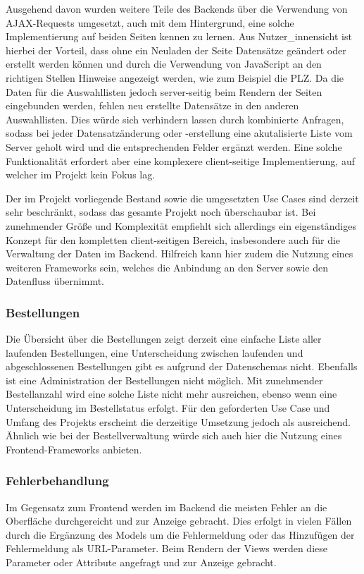 		Ausgehend davon wurden weitere Teile des Backends über die Verwendung von AJAX-Requests umgesetzt, auch mit dem Hintergrund, eine solche Implementierung auf beiden Seiten kennen zu lernen. Aus Nutzer\_innensicht ist hierbei der Vorteil, dass ohne ein Neuladen der Seite Datensätze geändert oder erstellt werden können und durch die Verwendung von JavaScript an den richtigen Stellen Hinweise angezeigt werden, wie zum Beispiel die PLZ. Da die Daten für die Auswahllisten jedoch server-seitig beim Rendern der Seiten eingebunden werden, fehlen neu erstellte Datensätze in den anderen Auswahllisten. Dies würde sich verhindern lassen durch kombinierte Anfragen, sodass bei jeder Datensatzänderung oder -erstellung eine akutalisierte Liste vom Server geholt wird und die entsprechenden Felder ergänzt werden. Eine solche Funktionalität erfordert aber eine komplexere client-seitige Implementierung, auf welcher im Projekt kein Fokus lag.
		
		Der im Projekt vorliegende Bestand sowie die umgesetzten Use Cases sind derzeit sehr beschränkt, sodass das gesamte Projekt noch überschaubar ist. Bei zunehmender Größe und Komplexität empfiehlt sich allerdings ein eigenständiges Konzept für den kompletten client-seitigen Bereich, insbesondere auch für die Verwaltung der Daten im Backend. Hilfreich kann hier zudem die Nutzung eines weiteren Frameworks sein, welches die Anbindung an den Server sowie den Datenfluss übernimmt.
		
		\subsubsection{Bestellungen}
		Die Übersicht über die Bestellungen zeigt derzeit eine einfache Liste aller laufenden Bestellungen, eine Unterscheidung zwischen laufenden und abgeschlossenen Bestellungen gibt es aufgrund der Datenschemas nicht. Ebenfalls ist eine Administration der Bestellungen nicht möglich. Mit zunehmender Bestellanzahl wird eine solche Liste nicht mehr ausreichen, ebenso wenn eine Unterscheidung im Bestellstatus erfolgt. Für den geforderten Use Case und Umfang des Projekts erscheint die derzeitige Umsetzung jedoch als ausreichend. Ähnlich wie bei der Bestellverwaltung würde sich auch hier die Nutzung eines Frontend-Frameworks anbieten.
		
		\subsubsection{Fehlerbehandlung}
		Im Gegensatz zum Frontend werden im Backend die meisten Fehler an die Oberfläche durchgereicht und zur Anzeige gebracht. Dies erfolgt in vielen Fällen durch die Ergänzung des Models um die Fehlermeldung oder das Hinzufügen der Fehlermeldung als URL-Parameter. Beim Rendern der Views werden diese Parameter oder Attribute angefragt und zur Anzeige gebracht.
	
